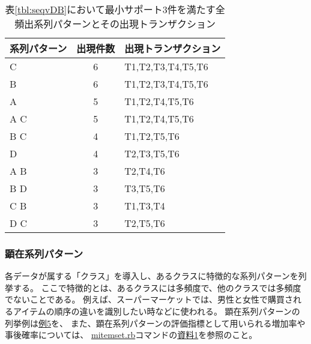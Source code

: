 \begin{table}[htbp]
\begin{center}
\caption{表\ref{tbl:seqvDB}において最小サポート3件を満たす全頻出系列パターンとその出現トランザクション\label{tbl:freqSeq}}
\begin{tabular}{lcl}
\hline
系列パターン&出現件数&出現トランザクション \\
\hline
C   & 6 & T1,T2,T3,T4,T5,T6\\
B   & 6 & T1,T2,T3,T4,T5,T6\\
A   & 5 & T1,T2,T4,T5,T6 \\
A C & 5 & T1,T2,T4,T5,T6 \\
B C & 4 & T1,T2,T5,T6 \\
D   & 4 & T2,T3,T5,T6\\
A B & 3 & T2,T4,T6\\
B D & 3 & T3,T5,T6\\
C B & 3 & T1,T3,T4\\
D C & 3 & T2,T5,T6\\
\hline
\end{tabular} 
\end{center}
\end{table} 



\subsubsection*{顕在系列パターン}
各データが属する「クラス」を導入し、あるクラスに特徴的な系列パターンを列挙する。
ここで特徴的とは、あるクラスには多頻度で、他のクラスでは多頻度でないことである。
例えば、スーパーマーケットでは、男性と女性で購買されるアイテムの順序の違いを識別したい時などに使われる。
顕在系列パターンの列挙例は\hyperref[ex:ep1]{例5}を、
また、顕在系列パターンの評価指標として用いられる増加率や事後確率については、
\hyperref[sect:mitemset]{mitemset.rb}コマンドの\hyperref[sect:ep]{資料1}を参照のこと。

